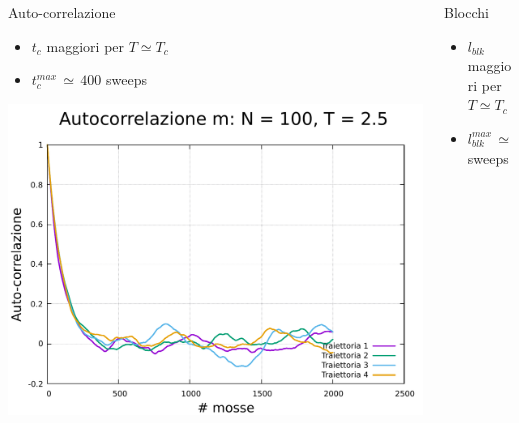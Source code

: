 \begin{frame}
\begin{columns}
        \begin{column}{0.33\textwidth}
            \begin{block}{Auto-correlazione}

                \begin{itemize}[itemsep=0.5em, label=$\diamond$]
                    \item $t_{c}$ maggiori per $T \simeq T_c$
                    \item $t_{c}^{max}\,\simeq\,400$ sweeps
                \end{itemize}

                \vspace{0.5cm}

                \centering
                \includegraphics[width=\textwidth]{Immagini/simIsing2D/auto_100_2.5.pdf}
            
            \end{block}
        \end{column}

        \begin{column}{0.33\textwidth}
            \begin{block}{Blocchi}
                \begin{itemize}[itemsep=0.5em, label=$\diamond$]
                    \item $l_{blk}$ maggiori per $T \simeq T_c$
                    \item $l_{blk}^{max}\,\simeq\,1000$ sweeps
                \end{itemize}

                \vspace{0.5cm}


\end{block}
\end{column}
\end{columns}
\end{frame}
